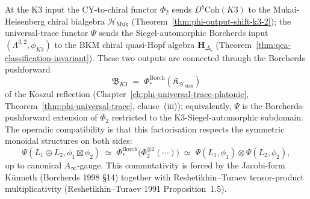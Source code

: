 \begin{remark}
\label{rem:cy2ch-phi-psi-operadic-commute}
At the K3 input the CY-to-chiral functor $\Phi_2$ sends
$D^b\mathrm{Coh}(K3)$ to the Mukai-Heisenberg chiral bialgebra
$\mathcal{H}_{\mathrm{Muk}}$
\textup{(}Theorem~\ref{thm:phi-output-shift-k3-2}\textup{);} the
universal-trace functor $\Psi$ sends the Siegel-automorphic Borcherds
input $(\Lambda^{3,2}, \phi_{K3})$ to the BKM chiral quasi-Hopf
algebra $\mathbf{H}_{\Delta_5}$
\textup{(}Theorem~\ref{thm:qca-classification-invariant}\textup{).}
These two outputs are connected through the Borcherds pushforward
\[
 \mathfrak{B}_{K3} \;=\; \Phi^{\mathrm{Borch}}_*(\mathfrak{K}_{\mathcal{H}_{\mathrm{Muk}}})
\]
of the Koszul reflection
\textup{(}Chapter~\ref{ch:phi-universal-trace-platonic},
Theorem~\ref{thm:phi-universal-trace}, clause~(iii)\textup{);}
equivalently, $\Psi$ is the Borcherds-pushforward extension of
$\Phi_2$ restricted to the K3-Siegel-automorphic subdomain. The
operadic compatibility is that this factorisation respects the
symmetric monoidal structures on both sides:
\[
 \Psi(L_1 \oplus L_2, \phi_1 \boxtimes \phi_2)
 \;\simeq\;
 \Phi^{\mathrm{Borch}}_*\bigl(\Phi_2^{\otimes 2}(\cdots)\bigr)
 \;\simeq\;
 \Psi(L_1, \phi_1) \otimes \Psi(L_2, \phi_2),
\]
up to canonical $A_\infty$-gauge. This commutativity is forced by the
Jacobi-form K\"unneth (Borcherds 1998 \S14) together with
Reshetikhin--Turaev tensor-product multiplicativity
(Reshetikhin--Turaev 1991 Proposition~1.5).
\end{remark}


